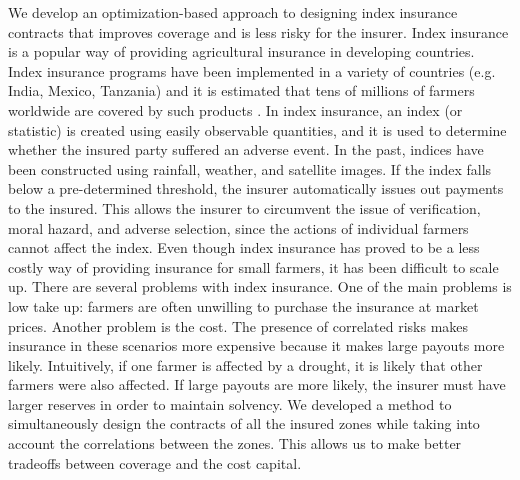 \documentclass[11pt]{article}
\begin{document}
We develop an optimization-based approach to designing index insurance contracts that improves coverage and is less risky for the insurer. Index insurance is a popular way of providing agricultural insurance in developing countries. Index insurance programs have been implemented in a variety of countries (e.g. India, Mexico, Tanzania) and it is estimated that tens of millions of farmers worldwide are covered by such products \cite{greatrex2015scaling}. In index insurance, an index (or statistic) is created using easily observable quantities, and it is used to determine whether the insured party suffered an adverse event. In the past, indices have been constructed using rainfall, weather, and satellite images. If the index falls below a pre-determined threshold, the insurer automatically issues out payments to the insured. This allows the insurer to circumvent the issue of verification, moral hazard, and adverse selection, since the actions of individual farmers cannot affect the index. Even though index insurance has proved to be a less costly way of providing insurance for small farmers, it has been difficult to scale up. There are several problems with index insurance. One of the main problems is low take up: farmers are often unwilling to purchase the insurance at market prices. Another problem  is the cost. The presence of correlated risks makes insurance in these scenarios more expensive because it makes large payouts more likely. Intuitively, if one farmer is affected by a drought, it is likely that other farmers were also affected. If large payouts are more likely, the insurer must have larger reserves in order to maintain solvency. We developed a method to simultaneously design the contracts of all the insured zones while taking into account the correlations between the zones. This allows us to make better tradeoffs between coverage and the cost capital.
\end{document}
